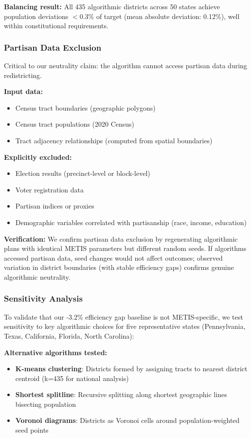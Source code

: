 \textbf{Balancing result:} All 435 algorithmic districts across 50 states achieve population deviations $<$0.3\% of target (mean absolute deviation: 0.12\%), well within constitutional requirements.

\subsubsection{Partisan Data Exclusion}

Critical to our neutrality claim: the algorithm cannot access partisan data during redistricting.

\textbf{Input data:}
\begin{itemize}
    \item Census tract boundaries (geographic polygons)
    \item Census tract populations (2020 Census)
    \item Tract adjacency relationships (computed from spatial boundaries)
\end{itemize}

\textbf{Explicitly excluded:}
\begin{itemize}
    \item Election results (precinct-level or block-level)
    \item Voter registration data
    \item Partisan indices or proxies
    \item Demographic variables correlated with partisanship (race, income, education)
\end{itemize}

\textbf{Verification:} We confirm partisan data exclusion by regenerating algorithmic plans with identical METIS parameters but different random seeds. If algorithms accessed partisan data, seed changes would not affect outcomes; observed variation in district boundaries (with stable efficiency gaps) confirms genuine algorithmic neutrality.

\subsubsection{Sensitivity Analysis}

To validate that our -3.2\% efficiency gap baseline is not METIS-specific, we test sensitivity to key algorithmic choices for five representative states (Pennsylvania, Texas, California, Florida, North Carolina):

\textbf{Alternative algorithms tested:}
\begin{itemize}
    \item \textbf{K-means clustering}: Districts formed by assigning tracts to nearest district centroid (k=435 for national analysis)
    \item \textbf{Shortest splitline}: Recursive splitting along shortest geographic lines bisecting population
    \item \textbf{Voronoi diagrams}: Districts as Voronoi cells around population-weighted seed points
\end{itemize}

